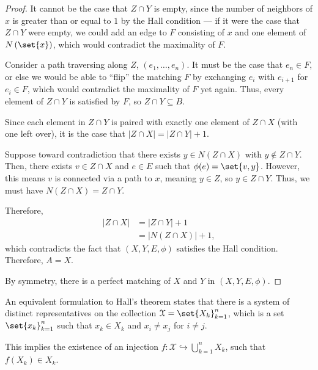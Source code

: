\begin{proof}
  It cannot be the case that $Z\cap Y$ is empty, since the number of neighbors of $x$ is greater than or equal to $1$ by the Hall condition --- if it were the case that $Z\cap Y$ were empty, we could add an edge to $F$ consisting of $x$ and one element of $N\left(\set{x}\right)$, which would contradict the maximality of $F$.\newline

  Consider a path traversing along $Z$, $\left(e_1,\dots,e_n\right)$. It must be the case that $e_n\in F$, or else we would be able to ``flip'' the matching $F$ by exchanging $e_{i}$ with $e_{i+1}$ for $e_i\in F$, which would contradict the maximality of $F$ yet again. Thus, every element of $Z\cap Y$ is satisfied by $F$, so $Z\cap Y\subseteq B$.\newline

  Since each element in $Z\cap Y$ is paired with exactly one element of $Z\cap X$ (with one left over), it is the case that $\left\vert Z\cap X \right\vert = \left\vert Z\cap Y \right\vert + 1$.\newline

  Suppose toward contradiction that there exists $y\in N\left(Z\cap X\right)$ with $y\notin Z\cap Y$. Then, there exists $v\in Z\cap X$ and $e\in E$ such that $\phi(e) = \set{v,y}$. However, this means $v$ is connected via a path to $x$, meaning $y\in Z$, so $y\in Z\cap Y$. Thus, we must have $N\left(Z\cap X\right) = Z\cap Y$.\newline

  Therefore,
  \begin{align*}
    \left\vert Z\cap X \right\vert &= \left\vert Z\cap Y \right\vert + 1\\
                                   &= \left\vert N\left(Z\cap X\right) \right\vert + 1,
  \end{align*}
  which contradicts the fact that $\left(X,Y,E,\phi\right)$ satisfies the Hall condition. Therefore, $A = X$.\newline

  By symmetry, there is a perfect matching of $X$ and $Y$ in $\left(X,Y,E,\phi\right)$.
\end{proof}
\begin{remark}
  An equivalent formulation to Hall's theorem states that there is a system of distinct representatives on the collection $\mathcal{X} = \set{X_k}_{k=1}^{n}$, which is a set $\set{x_{k}}_{k=1}^{n}$ such that $x_{k}\in X_{k}$ and $x_{i}\neq x_j$ for $i\neq j$.\newline

  This implies the existence of an injection $f\colon \mathcal{X}\hookrightarrow \bigcup_{k=1}^{n}X_{k}$, such that $f\left(X_k\right) \in X_k$.
\end{remark}

